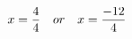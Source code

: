 \documentclass[preview]{standalone}
\begin{document}
\begin{align*}
\special{dvisvgm:raw <g id='unique000'>}x=\frac{4}{4} \quad or \quad x=\frac{-12}{4}\special{dvisvgm:raw </g>}
\end{align*}
\end{document}
